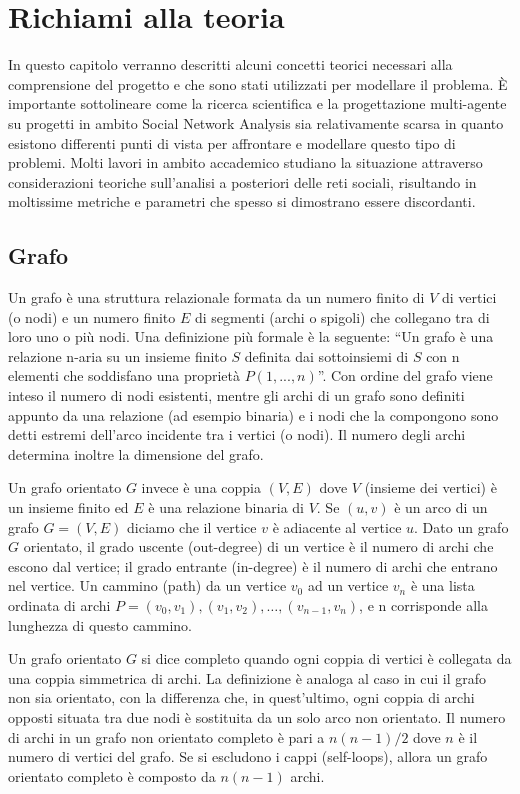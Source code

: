 \section{Richiami alla teoria}

In questo capitolo verranno descritti alcuni concetti teorici necessari alla comprensione del progetto e che sono stati utilizzati per modellare il problema.
È importante sottolineare come la ricerca scientifica e la progettazione multi-agente su progetti in ambito Social Network Analysis sia relativamente scarsa in quanto esistono differenti punti di vista per affrontare e modellare questo tipo di problemi. Molti lavori in ambito accademico studiano la situazione attraverso considerazioni teoriche sull'analisi a posteriori delle reti sociali, risultando in moltissime metriche e parametri che spesso si dimostrano essere discordanti.

\subsection{Grafo}

Un grafo è una struttura relazionale formata da un numero finito di $V$ di vertici (o nodi) e un numero finito $E$ di segmenti (archi o spigoli) che collegano tra di loro uno o più nodi.
Una definizione più formale è la seguente: “Un grafo è una relazione n-aria su un insieme finito $S$ definita dai sottoinsiemi di $S$ con n elementi che soddisfano una proprietà $P(1,...,n)$”.
Con ordine del grafo viene inteso il numero di nodi esistenti, mentre gli archi di un grafo sono definiti appunto da una relazione (ad esempio binaria) e i nodi che la compongono sono detti estremi dell'arco incidente tra i vertici (o nodi). Il numero degli archi determina inoltre la dimensione del grafo. \cite{IntroToAlgorithms}

Un grafo orientato $G$ invece è una coppia $(V,E)$ dove $V$ (insieme dei vertici) è un insieme finito ed $E$ è una relazione binaria di $V$.
Se $(u,v)$ è un arco di un grafo $G = (V,E)$ diciamo che il vertice $v$ è adiacente al vertice $u$.
Dato un grafo $G$ orientato, il grado uscente (out-degree) di un vertice è il numero di archi che escono dal vertice; il grado entrante (in-degree) è il numero di archi che entrano nel vertice.
Un cammino (path) da un vertice $v_0$ ad un vertice $v_n$ è una lista ordinata di archi $P={(v_0,v_1),(v_1,v_2), … , (v_{n-1}, v_n)}$, e n corrisponde alla lunghezza di questo cammino.

Un grafo orientato $G$ si dice completo quando ogni coppia di vertici è collegata da una coppia simmetrica di archi. La definizione è analoga al caso in cui il grafo non sia orientato, con la differenza che, in quest'ultimo, ogni coppia di archi opposti situata tra due nodi è sostituita da un solo arco non orientato. Il numero di archi in un grafo non orientato completo è pari a $n(n-1)/2$ dove $n$ è il numero di vertici del grafo. Se si escludono i cappi (self-loops), allora un grafo orientato completo è composto da $n(n-1)$ archi.

